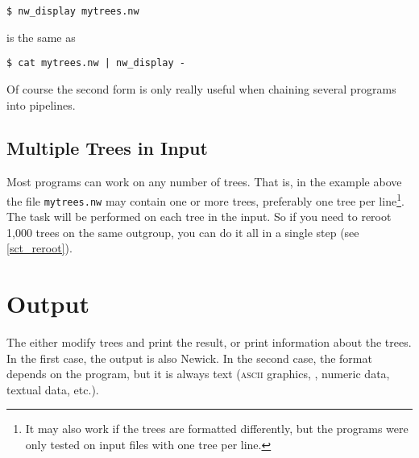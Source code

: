 \begin{samepage}
\begin{verbatim}
$ nw_display mytrees.nw
\end{verbatim}
is the same as
\begin{verbatim}
$ cat mytrees.nw | nw_display -
\end{verbatim}
\end{samepage}
Of course the second form is only really useful when chaining several programs into pipelines.

\subsection{Multiple Trees in Input}

Most programs can work on any number of trees. That is, in the example above the file \texttt{mytrees.nw} may contain one or more trees, preferably one tree per line\footnote{It may also work if the trees are formatted differently, but the programs were only tested on input files with one tree per line.}. The task will be performed on each tree in the input. So if you need to reroot 1,000 trees on the same outgroup, you can do it all in a single step (see \ref{sct_reroot}).

\section{Output}
\label{sect_output}

The \nutils{} either modify trees and print the result, or print information about the trees. In the first case, the output is also Newick. In the second case, the format depends on the program, but it is always text (\textsc{ascii} graphics, \svg, numeric data, textual data, etc.).

